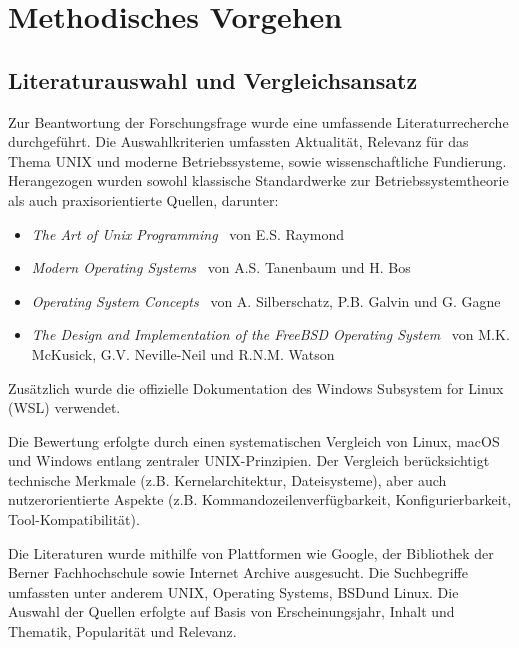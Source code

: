 \section{Methodisches Vorgehen}

\subsection{Literaturauswahl und Vergleichsansatz}

Zur Beantwortung der Forschungsfrage wurde eine umfassende Literaturrecherche durchgeführt. Die Auswahlkriterien umfassten Aktualität, Relevanz für das
Thema \glqq UNIX und moderne Betriebssysteme\grqq, sowie wissenschaftliche Fundierung. Herangezogen wurden sowohl klassische Standardwerke zur Betriebssystemtheorie
als auch praxisorientierte Quellen, darunter:

\begin{itemize}
	\setlength{\itemsep}{0pt}
	\item \textit{\glqq The Art of Unix Programming\grqq} \ von E.S. Raymond \cite{ArtOfUnixProgramming}
	\item \textit{\glqq Modern Operating Systems\grqq} \ von A.S. Tanenbaum und H. Bos \cite{ModernOS}
	\item \textit{\glqq Operating System Concepts\grqq} \ von A. Silberschatz, P.B. Galvin und G. Gagne \cite{OSConcept}
	\item \textit{\glqq The Design and Implementation of the FreeBSD Operating System\grqq} \ von M.K. McKusick, G.V. Neville-Neil und R.N.M. Watson \cite{FreeBSDOS}
\end{itemize}

Zusätzlich wurde die offizielle Dokumentation des Windows Subsystem for Linux (WSL) verwendet. \cite{WSL}

Die Bewertung erfolgte durch einen systematischen Vergleich von Linux, macOS und Windows entlang zentraler UNIX-Prinzipien. Der Vergleich berücksichtigt
technische Merkmale (z.B. Kernelarchitektur, Dateisysteme), aber auch nutzerorientierte Aspekte (z.B. Kommandozeilenverfügbarkeit, Konfigurierbarkeit,
Tool-Kompatibilität).

Die Literaturen wurde mithilfe von Plattformen wie Google, der Bibliothek der Berner Fachhochschule sowie Internet Archive ausgesucht. Die Suchbegriffe umfassten
unter anderem \glqq UNIX\grqq, \glqq Operating Systems\grqq, \glqq BSD\grqq und \glqq Linux\grqq. Die Auswahl der Quellen erfolgte auf Basis von Erscheinungsjahr,
Inhalt und Thematik, Popularität und Relevanz.

